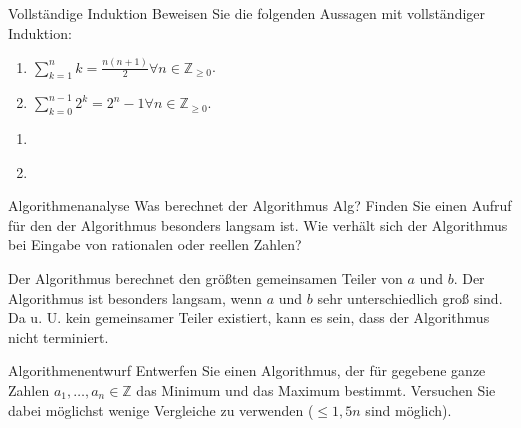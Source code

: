 \documentclass{article}
\begin{document}
\begin{exercise}{Vollständige Induktion}
  Beweisen Sie die folgenden Aussagen mit vollständiger Induktion:
  \begin{enumerate}
    \item $\sum_{k=1}^{n}{k} = \frac{n(n+1)}{2}\forall n \in \mathbb{Z}_{\ge 0}$.
    \item $\sum_{k=0}^{n-1} 2^k = 2^n-1\forall n \in \mathbb{Z}_{\ge 0}$.
  \end{enumerate}

  \begin{solution}
    \begin{enumerate}
      \item \begin{induction}
            \end{induction}
      \item \begin{induction}
            \end{induction}
    \end{enumerate}
  \end{solution}
\end{exercise}

\begin{exercise}{Algorithmenanalyse}
  Was berechnet der Algorithmus Alg? Finden Sie einen Aufruf für den der Algorithmus besonders langsam ist. Wie verhält sich der Algorithmus bei Eingabe von rationalen oder reellen Zahlen?
  

  \begin{solution}
    Der Algorithmus berechnet den größten gemeinsamen Teiler von $a$ und $b$. Der Algorithmus ist besonders langsam, wenn $a$ und $b$ sehr unterschiedlich groß sind. Da u. U. kein gemeinsamer Teiler existiert, kann es sein, dass der Algorithmus nicht terminiert.
  \end{solution}
\end{exercise}

\begin{exercise}{Algorithmenentwurf}
  Entwerfen Sie einen Algorithmus, der für gegebene ganze Zahlen $a_1, \ldots, a_n \in \mathbb{Z}$ das Minimum und das Maximum bestimmt. Versuchen Sie dabei möglichst wenige Vergleiche zu verwenden ($\leq 1,5n$ sind möglich).

  \begin{solution}
    
  \end{solution}
\end{exercise}
\end{document}
